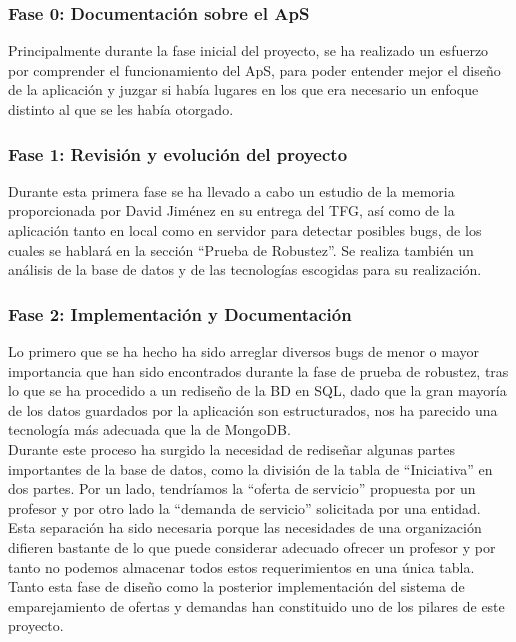 \documentclass{article}
\begin{document}
\subsubsection{Fase 0: Documentación sobre el ApS}
Principalmente durante la fase inicial del proyecto, se ha realizado un esfuerzo por comprender el funcionamiento del ApS, para poder entender mejor el diseño de la aplicación y juzgar si había lugares en los que era necesario un enfoque distinto al que se les había otorgado. 
\subsubsection{Fase 1: Revisión y evolución del proyecto}
Durante esta primera fase se ha llevado a cabo un estudio de la memoria proporcionada por David Jiménez en su entrega del TFG, así como de la aplicación tanto en local como en servidor para detectar posibles bugs, de los cuales se hablará en la sección ``Prueba de Robustez''.
Se realiza también un análisis de la base de datos y de las tecnologías escogidas para su realización.
\subsubsection{Fase 2: Implementación y Documentación}
Lo primero que se ha hecho ha sido arreglar diversos bugs de menor o mayor importancia que han sido encontrados durante la fase de prueba de robustez, tras lo que se ha procedido a un rediseño de la BD en SQL, dado que la gran mayoría de los datos guardados por la aplicación son estructurados, nos ha parecido una tecnología más adecuada que la de MongoDB.\\
Durante este proceso ha surgido la necesidad de rediseñar algunas partes importantes de la base de datos, como la división de la tabla de ``Iniciativa'' en dos partes. Por un lado, tendríamos la ``oferta de servicio'' propuesta por un profesor y por otro lado la ``demanda de servicio''   solicitada por una entidad. Esta separación ha sido necesaria porque las necesidades de una organización difieren bastante de lo que puede considerar adecuado ofrecer un profesor y por tanto no podemos almacenar todos estos requerimientos en una única tabla.\\
Tanto esta fase de diseño como la posterior implementación del sistema de emparejamiento de ofertas y demandas han constituido uno de los pilares de este proyecto.


\end{document}
